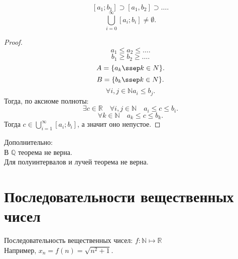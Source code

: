 \documentclass[11pt, oneside]{article}   	%
\begin{document}
    \begin{theorem}
        \[ [a_1;b_1] \supset [a_1, b_2] \supset \ldots .\]
        \[ \bigcup\limits_{i =0}^{\infty}[a_i; b_i] \neq \emptyset  .\] 
        \begin{proof}
            \[ a_1 \le a_2 \le \ldots .\]
            \[ b_1 \ge b_2 \ge \ldots .\]
            \[ A = \{a_k\ssep k \in N\}  .\]
            \[ B = \{b_k\ssep k \in N\}  .\]
            \[\forall{i, j \in \mathbb{N}} a_i \le b_j .\]
            Тогда, по аксиоме полноты:
            \[ \exists{c \in \mathbb{R}}\quad \forall{i, j \in \mathbb{N}}\quad a_i \le  c \le b_i .\]
            \[ \forall{k \in \mathbb{N}}\quad a_k \le c \le b_k .\]
            Тогда $c \in \bigcup\limits_{i=1}^{\infty}[a_i; b_i] $, а значит оно непустое.
        \end{proof}
        Дополнительно:\\
        В $\mathbb{Q}$ теорема не верна.\\
        Для полуинтервалов и лучей теорема не верна.
    \end{theorem}        
\section{Последовательности вещественных чисел}
    Последовательность вещественных чисел: $f : \mathbb{N} \mapsto \mathbb{R}$\\
    Например, $x_n = f(n) = \sqrt{n^2+1} $.
\end{document}
